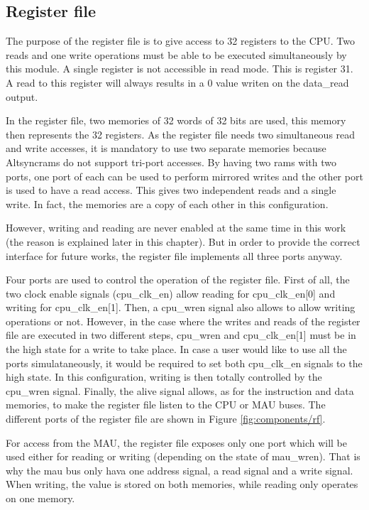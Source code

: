 \subsection{Register file}

The purpose of the register file is to give access to 32 registers to the CPU. Two reads and one 
write operations must be able to be executed simultaneously by this module. A single register is not 
accessible in read mode. This is register 31. A read to this register will always results in a 0
value writen on the data\_read output.

In the register file, two memories of 32 words of 32 bits are used, this memory then represents 
the 32 registers. As the register file needs two simultaneous read and write accesses, it is
mandatory to use two separate memories because Altsyncrams do not support tri-port accesses.
By having two rams with two ports, one port of each can be used to perform mirrored writes and the 
other port is used to have a read access. This gives two independent reads and a single write. In 
fact, the memories are a copy of each other in this configuration. 

However, writing and reading are never enabled at the same time in this work (the reason is explained
later in this chapter). But 
in order to provide the correct interface for future works, the register file implements all three 
ports anyway. 

Four ports are used to control the operation of the register file. First of all, the 
two clock enable signals (cpu\_clk\_en) allow reading for cpu\_clk\_en[0] and writing for cpu\_clk\_en[1].  Then, 
a cpu\_wren signal also allows to allow writing operations or not. However, in the case where the writes and 
reads of the register file are executed in two different steps, cpu\_wren and cpu\_clk\_en[1] must be in the 
high state for a write to take place. In case a user would like to use all the ports simulataneously, 
it would be required to set both cpu\_clk\_en signals to the high state. In this configuration, writing 
is then totally controlled by the cpu\_wren signal. Finally, the alive signal allows, as for the instruction and 
data memories, to make the register file listen to the CPU or MAU buses. The different ports of the register file 
are shown in Figure \ref{fig:components/rf}.

For access from the MAU, the register file exposes only one port which will be used either for 
reading or writing (depending on the state of mau\_wren). That is why the mau bus only hava one 
address signal, a read signal and a write signal. When writing, the value is stored on 
both memories, while reading only operates on one memory.

